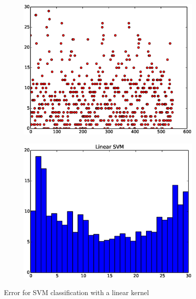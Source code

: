 \documentclass{article}
\begin{document}
\begin{figure}[H]
  \begin{subfigure}[!h]{0.5\textwidth}
    \centering
    \includegraphics[width=\textwidth]{./woodley/Linear_SVM_heading_plot.eps}
  \end{subfigure}
  \begin{subfigure}[!h]{0.5\textwidth}
    \centering
    \includegraphics[width=\textwidth]{./woodley/Linear_SVM_heading_bar.eps}
  \end{subfigure}
  \caption{Error for SVM classification with a linear kernel}
\end{figure}
\end{document}
